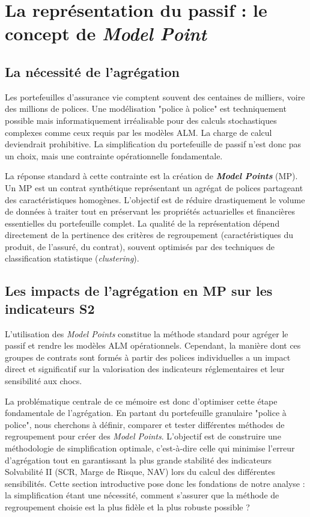 \section{La représentation du passif : le concept de \textit{Model Point}}
\label{sec:mp}

\subsection{La nécessité de l'agrégation}

Les portefeuilles d'assurance vie comptent souvent des centaines de milliers, voire des millions de polices. Une modélisation "police à police" est techniquement possible mais informatiquement irréalisable pour des calculs stochastiques complexes comme ceux requis par les modèles ALM. La charge de calcul deviendrait prohibitive. La simplification du portefeuille de passif n'est donc pas un choix, mais une contrainte opérationnelle fondamentale.



La réponse standard à cette contrainte est la création de \textbf{\textit{Model Points}} (MP). Un MP est un contrat synthétique représentant un agrégat de polices partageant des caractéristiques homogènes. L'objectif est de réduire drastiquement le volume de données à traiter tout en préservant les propriétés actuarielles et financières essentielles du portefeuille complet. La qualité de la représentation dépend directement de la pertinence des critères de regroupement (caractéristiques du produit, de l'assuré, du contrat), souvent optimisés par des techniques de classification statistique (\textit{clustering}).

\subsection{Les impacts de l'agrégation en MP sur les indicateurs S2}

L'utilisation des \textit{Model Points} constitue la méthode standard pour agréger le passif et rendre les modèles ALM opérationnels. Cependant, la manière dont ces groupes de contrats sont formés à partir des polices individuelles a un impact direct et significatif sur la valorisation des indicateurs réglementaires et leur sensibilité aux chocs.



La problématique centrale de ce mémoire est donc d'optimiser cette étape fondamentale de l'agrégation. En partant du portefeuille granulaire "police à police", nous cherchons à définir, comparer et tester différentes méthodes de regroupement pour créer des \textit{Model Points}. L'objectif est de construire une méthodologie de simplification optimale, c'est-à-dire celle qui minimise l'erreur d'agrégation tout en garantissant la plus grande stabilité des indicateurs Solvabilité II (SCR, Marge de Risque, NAV) lors du calcul des différentes sensibilités. Cette section introductive pose donc les fondations de notre analyse : la simplification étant une nécessité, comment s'assurer que la méthode de regroupement choisie est la plus fidèle et la plus robuste possible ?
